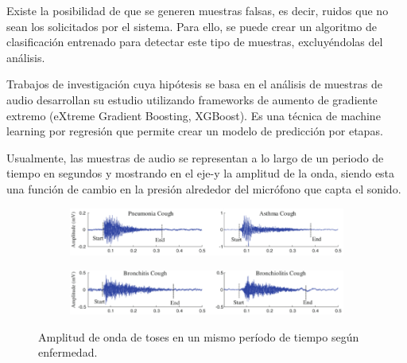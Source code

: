 \documentclass[journal]{IEEEtran}
\begin{document}
Existe la posibilidad de que se generen muestras falsas, es decir, ruidos que no sean los solicitados por el sistema. Para ello, se puede crear un algoritmo de clasificación entrenado para detectar este tipo de muestras, excluyéndolas del análisis.

Trabajos de investigación cuya hipótesis se basa en el análisis de muestras de audio desarrollan su estudio utilizando frameworks de aumento de gradiente extremo (eXtreme Gradient Boosting, XGBoost). Es una técnica de machine learning por regresión que permite crear un modelo de predicción por etapas\cite{tp}.

Usualmente, las muestras de audio se representan a lo largo de un periodo de tiempo en segundos y mostrando en el eje-y la amplitud de la onda, siendo esta una función de cambio en la presión alrededor del micrófono que capta el sonido.
\begin{figure}[H]
\begin{subfigure}[b]{1\columnwidth}
\includegraphics[width=\linewidth, keepaspectratio]{amplitude_pneumonia_asthma}
\end{subfigure}
\begin{subfigure}[b]{1\columnwidth}
\includegraphics[width=\linewidth]{amplitude_bronchitis_bronchiolitis}
\end{subfigure}
\caption{Amplitud de onda de toses en un mismo período de tiempo según enfermedad.}
\end{figure}
\end{document}
